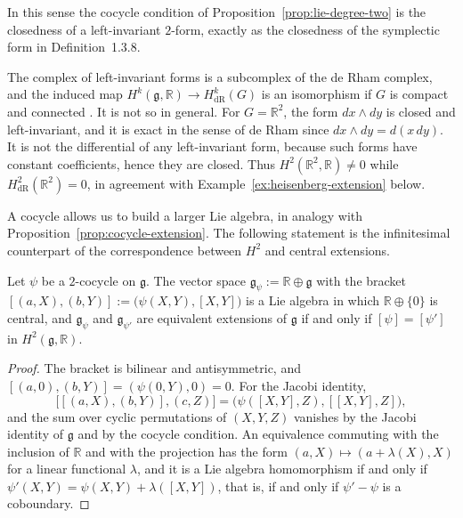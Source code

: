 \noindent In this sense the cocycle condition of Proposition~\ref{prop:lie-degree-two} is the closedness of a left-invariant $2$-form, exactly as the closedness of the symplectic form in Definition~1.3.8.

\begin{remark}\label{rem:chevalley-eilenberg}
	The complex of left-invariant forms is a subcomplex of the de Rham complex, and the induced map $H^k(\mathfrak{g},\mathbb{R})\to H^k_{\mathrm{dR}}(G)$ is an isomorphism if $G$ is compact and connected \cite[TODO-location]{TODO-ChevalleyEilenberg1948}. It is not so in general. For $G=\mathbb{R}^2$, the form $dx\wedge dy$ is closed and left-invariant, and it is exact in the sense of de Rham since $dx\wedge dy=d(x\,dy)$. It is not the differential of any left-invariant form, because such forms have constant coefficients, hence they are closed. Thus $H^2(\mathbb{R}^2,\mathbb{R})\neq0$ while $H^2_{\mathrm{dR}}(\mathbb{R}^2)=0$, in agreement with Example~\ref{ex:heisenberg-extension} below.
\end{remark}

A cocycle allows us to build a larger Lie algebra, in analogy with Proposition~\ref{prop:cocycle-extension}. The following statement is the infinitesimal counterpart of the correspondence between $H^2$ and central extensions.

\begin{proposition}\label{prop:lie-extension}
	Let $\psi$ be a $2$-cocycle on $\mathfrak{g}$. The vector space $\mathfrak{g}_\psi:=\mathbb{R}\oplus\mathfrak{g}$ with the bracket $[(a,X),(b,Y)]:=\big(\psi(X,Y),[X,Y]\big)$ is a Lie algebra in which $\mathbb{R}\oplus\{0\}$ is central, and $\mathfrak{g}_\psi$ and $\mathfrak{g}_{\psi'}$ are equivalent extensions of $\mathfrak{g}$ if and only if $[\psi]=[\psi']$ in $H^2(\mathfrak{g},\mathbb{R})$.
\end{proposition}

\begin{proof}
	The bracket is bilinear and antisymmetric, and $[(a,0),(b,Y)]=(\psi(0,Y),0)=0$. For the Jacobi identity,
	\begin{equation*}
		\big[[(a,X),(b,Y)],(c,Z)\big]=\big(\psi([X,Y],Z),[[X,Y],Z]\big),
	\end{equation*}
	and the sum over cyclic permutations of $(X,Y,Z)$ vanishes by the Jacobi identity of $\mathfrak{g}$ and by the cocycle condition. An equivalence commuting with the inclusion of $\mathbb{R}$ and with the projection has the form $(a,X)\mapsto(a+\lambda(X),X)$ for a linear functional $\lambda$, and it is a Lie algebra homomorphism if and only if $\psi'(X,Y)=\psi(X,Y)+\lambda([X,Y])$, that is, if and only if $\psi'-\psi$ is a coboundary.
\end{proof}

